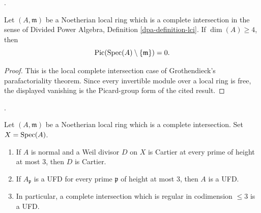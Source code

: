 \begin{theorem}
\label{theorem-ci-parafactorial}
\begin{reference}
\cite[Expos\'e XI, Th\'eor\`eme 3.13(ii)]{SGA2}.
\end{reference}
Let $(A, \mathfrak m)$ be a Noetherian local ring which is a complete
intersection in the sense of Divided Power Algebra, Definition
\ref{dpa-definition-lci}. If $\dim(A)\geq 4$, then
$$
\mathop{\mathrm{Pic}}\nolimits(\mathop{\mathrm{Spec}}(A)\setminus\{\mathfrak m\})=0.
$$
\end{theorem}

\begin{proof}
This is the local complete intersection case of Grothendieck's
parafactoriality theorem. Since every invertible module over a local ring is
free, the displayed vanishing is the Picard-group form of the cited result.
\end{proof}

\begin{theorem}
\label{theorem-ci-Cartier-codimension-three}
\begin{reference}
\cite[Expos\'e XI, Corollaire 3.14]{SGA2}.
\end{reference}
Let $(A, \mathfrak m)$ be a Noetherian local ring which is a complete
intersection. Set $X=\mathop{\mathrm{Spec}}(A)$.
\begin{enumerate}
\item If $A$ is normal and a Weil divisor $D$ on $X$ is Cartier at every
prime of height at most $3$, then $D$ is Cartier.
\item If $A_\mathfrak p$ is a UFD for every prime $\mathfrak p$ of height at
most $3$, then $A$ is a UFD.
\item In particular, a complete intersection which is regular in codimension
$\leq 3$ is a UFD.
\end{enumerate}
\end{theorem}

